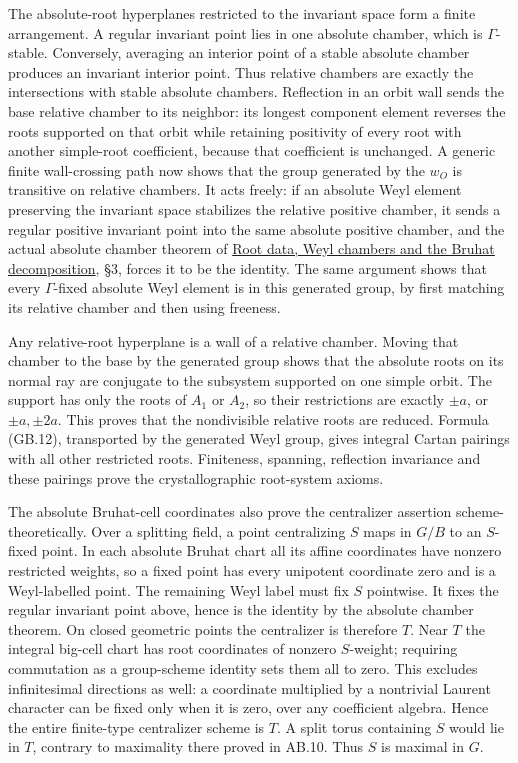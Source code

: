 \documentclass[
  11pt,
]{article}
\begin{document}
The absolute-root hyperplanes restricted to the invariant space form a
finite arrangement. A regular invariant point lies in one absolute
chamber, which is \(\Gamma\)-stable. Conversely, averaging an interior
point of a stable absolute chamber produces an invariant interior point.
Thus relative chambers are exactly the intersections with stable
absolute chambers. Reflection in an orbit wall sends the base relative
chamber to its neighbor: its longest component element reverses the
roots supported on that orbit while retaining positivity of every root
with another simple-root coefficient, because that coefficient is
unchanged. A generic finite wall-crossing path now shows that the group
generated by the \(w_O\) is transitive on relative chambers. It acts
freely: if an absolute Weyl element preserving the invariant space
stabilizes the relative positive chamber, it sends a regular positive
invariant point into the same absolute positive chamber, and the actual
absolute chamber theorem of \href{../AG-RG/AG-RG-04.html}{Root data,
Weyl chambers and the Bruhat decomposition}, §3, forces it to be the
identity. The same argument shows that every \(\Gamma\)-fixed absolute
Weyl element is in this generated group, by first matching its relative
chamber and then using freeness.

Any relative-root hyperplane is a wall of a relative chamber. Moving
that chamber to the base by the generated group shows that the absolute
roots on its normal ray are conjugate to the subsystem supported on one
simple orbit. The support has only the roots of \(A_1\) or \(A_2\), so
their restrictions are exactly \(\pm a\), or \(\pm a,\pm2a\). This
proves that the nondivisible relative roots are reduced. Formula
(GB.12), transported by the generated Weyl group, gives integral Cartan
pairings with all other restricted roots. Finiteness, spanning,
reflection invariance and these pairings prove the crystallographic
root-system axioms.

The absolute Bruhat-cell coordinates also prove the centralizer
assertion scheme-theoretically. Over a splitting field, a point
centralizing \(S\) maps in \(G/B\) to an \(S\)-fixed point. In each
absolute Bruhat chart all its affine coordinates have nonzero restricted
weights, so a fixed point has every unipotent coordinate zero and is a
Weyl-labelled point. The remaining Weyl label must fix \(S\) pointwise.
It fixes the regular invariant point above, hence is the identity by the
absolute chamber theorem. On closed geometric points the centralizer is
therefore \(T\). Near \(T\) the integral big-cell chart has root
coordinates of nonzero \(S\)-weight; requiring commutation as a
group-scheme identity sets them all to zero. This excludes infinitesimal
directions as well: a coordinate multiplied by a nontrivial Laurent
character can be fixed only when it is zero, over any coefficient
algebra. Hence the entire finite-type centralizer scheme is \(T\). A
split torus containing \(S\) would lie in \(T\), contrary to maximality
there proved in AB.10. Thus \(S\) is maximal in \(G\).
\end{document}
